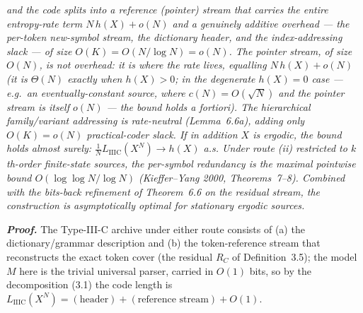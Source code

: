 \documentclass[
]{article}
\begin{document}
\emph{and the code splits into a reference (pointer) stream that
carries the entire entropy-rate term $N\,h(X) + o(N)$ and a genuinely
additive overhead --- the per-token new-symbol stream, the dictionary
header, and the index-addressing slack --- of size $O(K) = O(N/\log N)
= o(N)$. The pointer stream, of size $O(N)$, is \emph{not} overhead: it
is where the rate lives, equalling $N\,h(X) + o(N)$ (it is $\Theta(N)$
exactly when $h(X) > 0$; in the degenerate $h(X) = 0$ case ---
e.g.\ an eventually-constant source, where $c(N) = O(\sqrt{N})$ and the
pointer stream is itself $o(N)$ --- the bound holds a fortiori). The
hierarchical family/variant addressing is rate-neutral (Lemma~6.6a),
adding only $O(K) = o(N)$ practical-coder slack. If in addition $X$ is
\emph{ergodic}, the bound holds almost surely:
$\tfrac{1}{N} L_{\mathrm{IIIC}}(X^N) \to h(X)$ a.s. Under route (ii)
restricted to $k$th-order finite-state sources, the per-symbol
redundancy is the maximal pointwise bound $O(\log\log N / \log N)$
(Kieffer--Yang 2000, Theorems~7--8). Combined with the bits-back
refinement of Theorem~6.6 on the residual stream, the construction is
asymptotically optimal for stationary ergodic sources.}

\emph{\textbf{Proof.}} The Type-III-C archive under either route
consists of (a) the dictionary/grammar description and (b) the
token-reference stream that reconstructs the exact token cover (the
residual $R_C$ of Definition~3.5); the model $M$ here is the trivial
universal parser, carried in $O(1)$ bits, so by the decomposition
(3.1) the code length is $L_{\mathrm{IIIC}}(X^N) = (\text{header}) +
(\text{reference stream}) + O(1)$.
\end{document}
